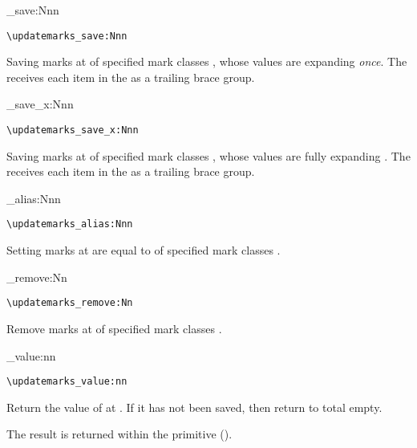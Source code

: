 \documentclass{l3doc}
\begin{document}
\begin{function}{\updatemarks_save:Nnn}
  \begin{syntax}
    \verb|\updatemarks_save:Nnn|   
  \end{syntax}
Saving marks at  of specified mark classes ,
whose values are expanding  \emph{once}.
The  receives each item in the  
as a trailing brace group.
\end{function}

\begin{function}{\updatemarks_save_x:Nnn}
  \begin{syntax}
    \verb|\updatemarks_save_x:Nnn|   
  \end{syntax}
Saving marks at  of specified mark classes ,
whose values are fully expanding .
The  receives each item in the  
as a trailing brace group.
\end{function}

\begin{function}{\updatemarks_alias:Nnn}
  \begin{syntax}
    \verb|\updatemarks_alias:Nnn|   
  \end{syntax}
Setting marks at  are equal to  
of specified mark classes .
\end{function}

\begin{function}{\updatemarks_remove:Nn}
  \begin{syntax}
    \verb|\updatemarks_remove:Nn|  
  \end{syntax}
Remove marks at  of specified mark classes .
\end{function}

\begin{function}[EXP]{\updatemarks_value:nn}
  \begin{syntax}
    \verb|\updatemarks_value:nn|  
  \end{syntax}
Return the value of  at .
If it has not been saved, then return to total empty.

\begin{texnote}
  The result is returned within the  primitive ().
\end{texnote}
\end{function}
\end{document}
